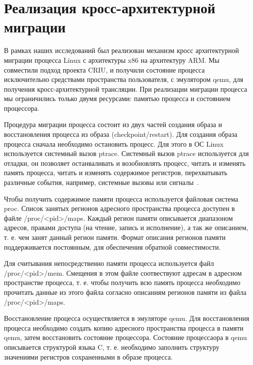\section{Реализация кросс-архитектурной миграции}

В рамках наших исследований был реализован механизм кросс архитектурной миграции процесса Linux с архитектуры x86 на архитектуру ARM. Мы совместили подход проекта CRIU, и получили состояние процесса исключительно средствами пространства пользователя, с эмулятором qemu, для получения кросс-архитектурной трансляции. При реализации миграции процесса мы ограничились только двумя ресурсами: памятью процесса и состоянием процессора.

Процедура миграции процесса состоит из двух частей создания образа и восстановления процесса из образа (checkpoint/restart). Для создания образа процесса сначала необходимо остановить процесс. Для этого в ОС Linux используется системный вызов ptrace. Системный вызов ptrace используется для отладки, он позволяет останваливать и возобновлять процесс, читать и изменять память процесса, читать и изменять содержимое регистров, перехватывать различные события, например, системные вызовы или сигналы~\cite{PTRACEP1,PTRACEP2}.

Чтобы получить содержимое памяти процесса используется файловая система proc. Список занятых регионов адресного пространства процесса доступен в файле /proc/<pid>/maps. Каждый регион памяти описывается диапазоном адресов, правами доступа (на чтение, запись и исполнение), а так же описанием, т. е. чем занят данный регион памяти. Формат описания регионов памяти поддерживается постоянным, для обеспечения обратной совместимости.

Для считывания непосредственно памяти процесса используется файл /proc/<pid>/mem. Смещения в этом файле соотвествуют адресам в адресном пространстве процесса, т. е. чтобы получить всю память процесса необходимо прочитать данные из этого файла согласно описаниям регионов памяти из файла /proc/<pid>/maps.

Восстановление процесса осуществляется в эмуляторе qemu. Для восстановления процесса необходимо создать копию адресного пространства процесса в памяти qemu, затем восстановить состояние процессора. Состояние процессаора в qemu описывается структурой языка C, т. е. необходимо заполнить структуру значениями регистров сохраненными в образе процесса.


